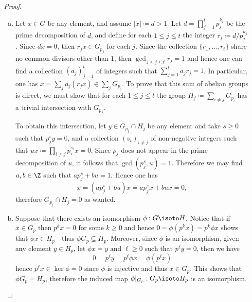 \begin{proof}
    \begin{enumerate}[(a)]\setlength\itemsep{0em}
        \item Let \(x \in G\) be any element, and assume \(|x| \coloneq d > 1\). Let
              \(d = \prod_{j=1}^t p_j^{k_j}\) be the prime decomposition of \(d\), and define
              for each \(1 \leq j \leq t\) the integer \(r_j \coloneq d/p_j^{k_j}\). Since
              \(d x = 0\), then \(r_j x \in G_{p_j}\) for each \(j\). Since the collection
              \(\{r_1, \dots, r_t\}\) share no common divisors other than \(1\), then
              \(\gcd_{1 \leq j \leq t} r_j = 1\) and hence one can find a collection
              \((a_j)_{j=1}^t\) of integers such that \(\sum_{j=1}^t a_j r_j = 1\). In
              particular, one has \(x = \sum_j a_j (r_j x) \in \sum_j G_{p_j}\). To prove
              that this sum of abelian groups is direct, we must show that for each
              \(1 \leq j \leq t\) the group \(H_j \coloneq \sum_{i \neq j} G_{p_i}\) has a
              trivial intersection with \(G_{p_j}\).

              To obtain this intersection, let \(y \in G_{p_j} \cap H_j\) be any element and
              take \(s \geq 0\) such that \(p_j^s y = 0\), and a collection
              \((s_i)_{i \neq j}\) of non-negative integers such that
              \(u x \coloneq \prod_{i \neq j} p_i^{s_i} x = 0\). Since \(p_j\) does not
              appear in the prime decomposition of \(u\), it follows that
              \(\gcd(p_j^s, u) = 1\). Therefore we may find \(a, b \in \Z\) such that
              \(a p_j^s + b u = 1\). Hence one has
              \[
                  x = (a p_j^s + b u) x = a p_j^s x + b u x = 0,
              \]
              therefore \(G_{p_j} \cap H_j = 0\) as wanted.

        \item Suppose that there exists an isomorphism \(\phi: G \isoto H\). Notice that
              if \(x \in G_p\) then \(p^k x = 0\) for some \(k \geq 0\) and hence
              \(0 = \phi(p^k x) = p^k \phi x\) shows that \(\phi x \in H_p\)---thus \(\phi
              G_p \subseteq H_p\). Moreover, since \(\phi\) is an isomorphism, given any
              element \(y \in H_p\), let \(\phi x = y\) and \(\ell \geq 0\) such that
              \(p^{\ell} y = 0\), then we have
              \[
                  0 = p^{\ell} y = p^{\ell} \phi x = \phi(p^{\ell} x)
              \]
              hence \(p^{\ell} x \in \ker \phi = 0\) since \(\phi\) is injective and thus
              \(x \in G_p\). This shows that \(\phi G_p = H_p\), therefore the induced map
              \(\phi|_{G_p}: G_p \isoto H_p\) is an isomorphism.


\end{enumerate}
\end{proof}
